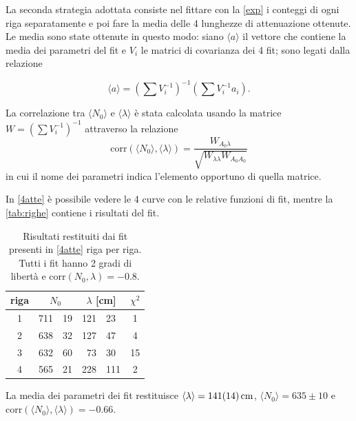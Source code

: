 La seconda strategia adottata consiste nel fittare con la \eqref{exp} i conteggi di ogni riga separatamente e poi fare la media delle 4 lunghezze di attenuazione ottenute.
Le media sono state ottenute in questo modo: siano $\langle a \rangle$ il vettore che contiene la media dei parametri del fit e $V_i$ le matrici di covarianza dei 4 fit; sono legati dalla relazione 

\begin{equation*}
\langle a \rangle = \left(\sum{V_i^{-1}} \right)^{-1}  \left(\sum{V_i^{-1} a_i} \right).
\end{equation*}

La correlazione tra $\langle N_0 \rangle$ e $\langle \lambda \rangle$ è stata calcolata usando la matrice $W=\left(\sum{V_i^{-1}} \right)^{-1}$ attraverso la relazione
\begin{equation*}
\text{corr}(\langle N_0 \rangle ,\langle \lambda \rangle)=\frac{W_{A_0 \lambda}}{\sqrt{ W_{\lambda \lambda} W_{A_0 A_0}}}
\end{equation*}
in cui il nome dei parametri indica l'elemento opportuno di quella matrice.

In \autoref{4atte} è possibile vedere le 4 curve con le relative funzioni di fit, mentre la \autoref{tab:righe} contiene i risultati del fit.

\begin{table}[h]
\centering
\begin{tabular}{| c | r @{$\,\pm\,$} l  | r @{$\,\pm\,$} l  | c |}
\hline
riga & \multicolumn{2}{c|}{$N_0$} & \multicolumn{2}{c|}{ $\lambda$ [\si{cm}] } & $\chi^2$  \\
\hline
1 & 711&19 & 121&23 & 1  \\
2 & 638&32 & 127&47 & 4 \\
3 & 632&60 & 73&30 & 15 \\
4 & 565&21 & 228&111 & 2 \\
\hline
\end{tabular}
\caption{Risultati restituiti dai fit presenti in \autoref{4atte} riga per riga. Tutti i fit hanno 2 gradi di libertà e corr$(N_0,\lambda)=-0.8$. }
\label{tab:righe}
\end{table}


La media dei parametri dei fit restituisce $\langle\lambda\rangle=\SI{141\pm14}{cm}$, $\langle N_0\rangle=635\pm10$ e corr$(\langle N_0 \rangle ,\langle \lambda \rangle)=-0.66$.

